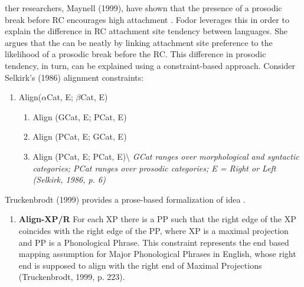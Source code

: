 \documentclass[12pt,oneside]{book}
\providecommand{\tightlist}{%
  \setlength{\itemsep}{0pt}\setlength{\parskip}{0pt}}
\begin{document}
ther researchers,  Maynell (1999), have shown that the presence  of a prosodic break before  RC  encourages high  attachment . Fodor leverages this in order to explain the difference in RC attachment site tendency between languages. She argues that the  can be neatly  by linking attachment site preference to the likelihood of a prosodic break before the RC. This difference in prosodic tendency, in turn, can be explained using a constraint-based approach. Consider Selkirk's (1986) alignment constraints:

\begin{enumerate}
\def\labelenumi{(\arabic{enumi})}
\setcounter{enumi}{32}
\tightlist
\item
  Align(\(\alpha\)Cat, E; \(\beta\)Cat, E)

  \begin{enumerate}
  \def\labelenumii{\alph{enumii}.}
  \tightlist
  \item
    Align (GCat, E; PCat, E)
  \item
    Align (PCat, E; GCat, E)
  \item
    Align (PCat, E; PCat, E)\textbackslash{}
    \emph{GCat ranges over morphological and syntactic categories; PCat ranges over prosodic categories; E = Right or Left (Selkirk, 1986, p. 6)}
  \end{enumerate}
\end{enumerate}

Truckenbrodt (1999) provides a prose-based formalization of  idea .

\begin{enumerate}
\def\labelenumi{(\arabic{enumi})}
\setcounter{enumi}{33}
\tightlist
\item
  \textbf{Align-XP/R} \linebreak
  For each XP there is a PP such that the right edge of the XP coincides with the right edge of the PP, where XP is a maximal projection and PP is a Phonological Phrase. This constraint represents the end based mapping assumption for Major Phonological Phrases in English, whose right end is supposed to align with the right end of Maximal Projections (Truckenbrodt, 1999, p. 223).
\end{enumerate}
\end{document}
